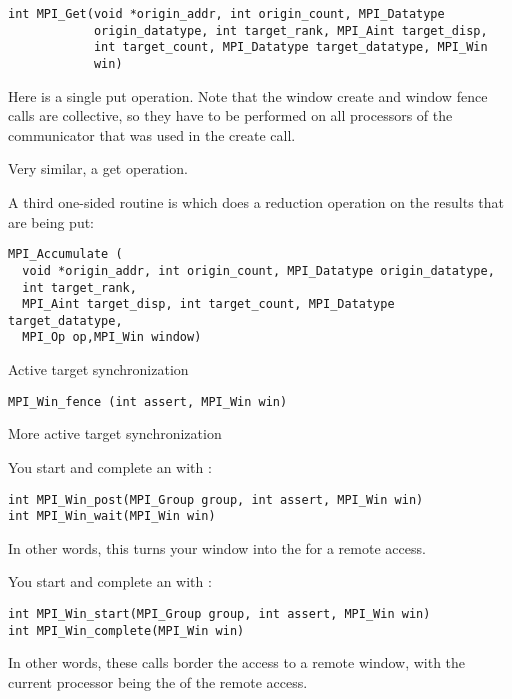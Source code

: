 \begin{verbatim}
int MPI_Get(void *origin_addr, int origin_count, MPI_Datatype
            origin_datatype, int target_rank, MPI_Aint target_disp,
            int target_count, MPI_Datatype target_datatype, MPI_Win
            win)
\end{verbatim}

Here is a single put operation. Note that the window create and window fence calls
are collective, so they have to be performed on all processors
of the communicator that was used in the create call.

Very similar, a get operation.

A third one-sided routine
is  which does a reduction operation on the results
that are being put:
\begin{verbatim}
MPI_Accumulate (
  void *origin_addr, int origin_count, MPI_Datatype origin_datatype, 
  int target_rank,
  MPI_Aint target_disp, int target_count, MPI_Datatype target_datatype,
  MPI_Op op,MPI_Win window)
\end{verbatim}

 {Active target synchronization}

\begin{verbatim}
MPI_Win_fence (int assert, MPI_Win win)
\end{verbatim}

 {More active target synchronization}

You start and complete an  with%
:
\begin{verbatim}
int MPI_Win_post(MPI_Group group, int assert, MPI_Win win)
int MPI_Win_wait(MPI_Win win)
\end{verbatim}
In other words, this turns your window into the  for a remote access.

You start and complete an  with%
:
\begin{verbatim}
int MPI_Win_start(MPI_Group group, int assert, MPI_Win win)
int MPI_Win_complete(MPI_Win win)
\end{verbatim}
In other words, these calls border the access to a remote window, with the current processor
being the  of the remote access.

